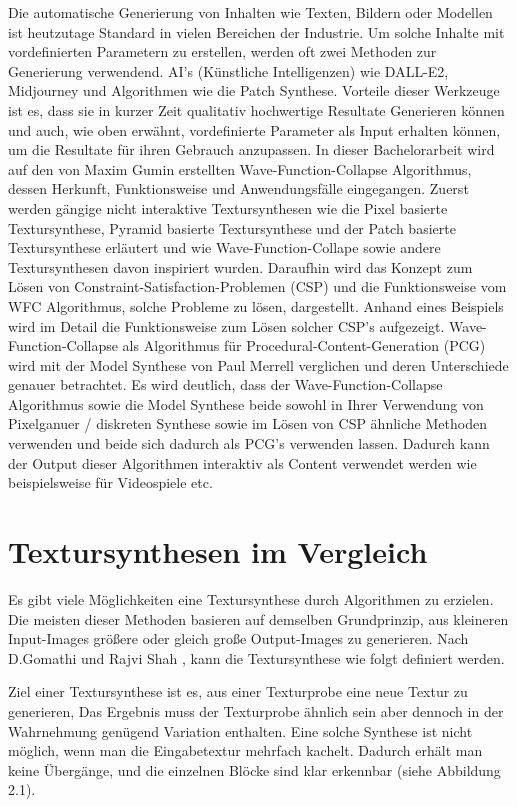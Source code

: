 \documentclass[12pt, a4paper,twoside,openany]{report} %
\begin{document}
Die automatische Generierung von Inhalten wie Texten, Bildern oder Modellen ist heutzutage Standard in vielen Bereichen der Industrie.
Um solche Inhalte mit vordefinierten Parametern zu erstellen, werden oft zwei Methoden zur Generierung verwendend.
AI's {(Künstliche Intelligenzen)} wie DALL-E2, Midjourney und Algorithmen wie die Patch Synthese.
Vorteile dieser Werkzeuge ist es, dass sie in kurzer Zeit qualitativ hochwertige Resultate Generieren können und auch, wie oben erwähnt,
vordefinierte Parameter als Input erhalten können, um die Resultate für ihren Gebrauch anzupassen.
In dieser Bachelorarbeit wird auf den von Maxim Gumin erstellten Wave-Function-Collapse Algorithmus, dessen Herkunft, Funktionsweise und Anwendungsfälle eingegangen.
Zuerst werden gängige nicht interaktive Textursynthesen wie die Pixel basierte Textursynthese, Pyramid basierte Textursynthese und der Patch basierte Textursynthese erläutert
und wie Wave-Function-Collape sowie andere Textursynthesen davon inspiriert wurden.
Daraufhin wird das Konzept zum Lösen von Constraint-Satisfaction-Problemen {(CSP)} und die Funktionsweise vom WFC Algorithmus, solche Probleme zu lösen, dargestellt.
Anhand eines Beispiels wird im Detail die Funktionsweise zum Lösen solcher CSP's aufgezeigt.
Wave-Function-Collapse als Algorithmus für Procedural-Content-Generation {(PCG)} wird mit der Model Synthese von Paul Merrell verglichen und deren Unterschiede genauer betrachtet.
Es wird deutlich, dass der Wave-Function-Collapse Algorithmus sowie die Model Synthese beide sowohl in Ihrer Verwendung von Pixelganuer / diskreten Synthese sowie im Lösen von
CSP ähnliche Methoden verwenden und beide sich dadurch als PCG's verwenden lassen.
Dadurch kann der Output dieser Algorithmen interaktiv als Content verwendet werden wie beispielsweise für Videospiele etc.

\chapter{Textursynthesen im Vergleich}

Es gibt viele Möglichkeiten eine Textursynthese durch Algorithmen zu erzielen.
Die meisten dieser Methoden basieren auf demselben Grundprinzip, aus kleineren Input-Images größere oder gleich große Output-Images zu generieren.
Nach D.Gomathi und Rajvi Shah \cite[S.1]{GomathiShah2009}, kann die Textursynthese wie folgt definiert werden.\par
Ziel einer Textursynthese ist es, aus einer Texturprobe eine neue Textur zu generieren, 
Das Ergebnis muss der Texturprobe ähnlich sein aber dennoch in der Wahrnehmung genügend Variation enthalten.
Eine solche Synthese ist nicht möglich, wenn man die Eingabetextur mehrfach kachelt.
Dadurch erhält man keine  Übergänge, und die einzelnen Blöcke sind klar erkennbar {(siehe Abbildung 2.1)}.
\end{document}
